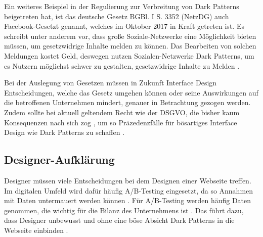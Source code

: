 \documentclass[conference,compsoc,final,a4paper]{IEEEtran}
\begin{document}
Ein weiteres Beispiel in der Regulierung zur Verbreitung von Dark Patterns beigetreten hat, ist das deutsche Gesetz BGBl. I S. 3352 (\acs{NetzDG}) auch Facebook-Gesetzt genannt, welches im Oktober 2017 in Kraft getreten ist. Es schreibt unter anderem vor, dass große Soziale-Netzwerke eine Möglichkeit bieten müssen, um gesetzwidrige Inhalte melden zu können. Das Bearbeiten von solchen Meldungen kostet Geld, deswegen nutzen Sozialen-Netzwerke Dark Patterns, um es Nutzern möglichst schwer zu gestalten, gesetzwidrige Inhalte zu Melden \autocite{Rieger2020}.


Bei der Auslegung von Gesetzen müssen in Zukunft Interface Design Entscheidungen, welche das Gesetz umgehen können oder seine Auswirkungen auf die betroffenen Unternehmen mindert, genauer in Betrachtung gezogen werden. Zudem sollte bei aktuell geltendem Recht wie der \acs{DSGVO}, die bisher kaum Konsequenzen nach sich zog \autocite{Nouwens2020}, um so Präzedenzfälle für bösartiges Interface Design wie Dark Patterns zu schaffen \autocite{Rieger2020}.

\subsection{Designer-Aufklärung}
Designer müssen viele Entscheidungen bei dem Designen einer Webseite treffen. Im digitalen Umfeld wird dafür häufig A/B-Testing eingesetzt, da so Annahmen mit Daten untermauert werden können \autocite{Kohavi2017}. Für A/B-Testing werden häufig Daten genommen, die wichtig für die Bilanz des Unternehmens ist \autocites{Kohavi2017}{Narayanan2020}. Das führt dazu, dass Designer unbewusst und ohne eine böse Absicht Dark Patterns in die Webseite einbinden \autocite{Narayanan2020}.

\end{document}
